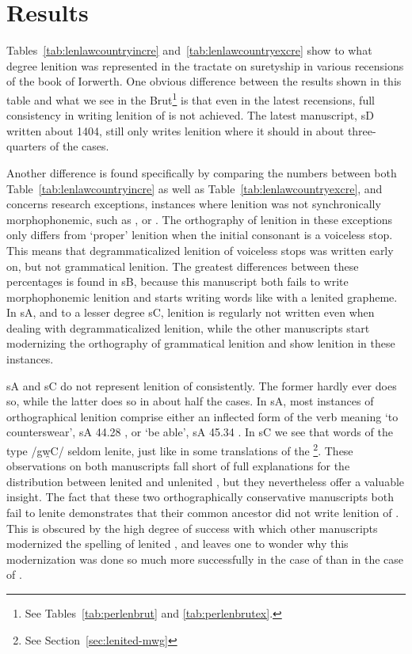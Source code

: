 \section{Results}
\label{sec:results}

Tables~\ref{tab:lenlawcountryincre} and~\ref{tab:lenlawcountryexcre} show to what degree lenition was represented in the tractate on suretyship in various recensions of the book of Iorwerth. One obvious difference between the results shown in this table and what we see in the Brut\footnote{See Tables~\ref{tab:perlenbrut} and \ref{tab:perlenbrutex}.} is that even in the latest recensions, full consistency in writing  lenition of  is not achieved. The latest manuscript, \gls{sD} written about 1404, still only writes lenition where it should in about three-quarters of the cases.

Another difference is found specifically by comparing the numbers between both Table~\ref{tab:lenlawcountryincre} as well as Table~\ref{tab:lenlawcountryexcre}, and concerns research exceptions, \ie instances where lenition was not synchronically morphophonemic, such as , or . The orthography of lenition in these exceptions only differs from `proper' lenition when the initial consonant is a voiceless stop. This means that degrammaticalized lenition of voiceless stops was written early on, but not grammatical lenition. The greatest differences between these percentages is found in \gls{sB}, because this manuscript both fails to write morphophonemic lenition and starts writing words like  with a lenited grapheme. In \gls{sA}, and to a lesser degree \gls{sC}, lenition is regularly not written even when dealing with degrammaticalized lenition, while the other manuscripts start modernizing the orthography of grammatical lenition and show lenition in these instances.

\Gls{sA} and \gls{sC} do not represent lenition of  consistently. The former hardly ever does so, while the latter does so in about half the cases. In \gls{sA}, most instances of orthographical lenition comprise either an inflected form of the verb meaning `to counterswear', \eg \gls{sA} 44.28 , or `be able', \eg \gls{sA} 45.34 . In \gls{sC} we see that words of the type /gw̯\gls{C}/ seldom lenite, just like in some translations of the \footnote{See Section~\ref{sec:lenited-mwg}}. These observations on both manuscripts fall short of full explanations for the distribution between lenited and unlenited , but they nevertheless offer a valuable insight. The fact that these two orthographically conservative manuscripts both fail to lenite  demonstrates that their common ancestor did not write lenition of . This is obscured by the high degree of success with which other manuscripts modernized the spelling of lenited , and leaves one to wonder why this modernization was done so much more successfully in the case of  than in the case of .

